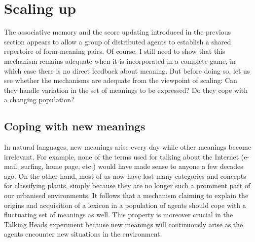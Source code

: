 \section{Scaling up} 

The associative memory and the score updating introduced
in the previous section appears to allow a group of 
distributed agents to establish a shared repertoire of
form-meaning pairs. Of course, I still need to show that 
this mechanism remains adequate when it is incorporated
in a complete game, in which case there is no direct feedback 
about meaning. But before doing so, let us see whether 
the mechanisms are adequate from the viewpoint of scaling: 
Can they handle variation in the set of meanings to 
be expressed? Do they cope with a changing population? 

\subsection{Coping with new meanings}

In natural languages, new meanings arise every day 
while other meanings become irrelevant. 
For example, none of the terms used for talking about
the Internet (e-mail,
surfing, home page, etc.) would have made sense to anyone
a few decades ago. On the other hand, most of us now have lost 
many categories and concepts for classifying plants, 
simply because they are no longer such a prominent part of our 
urbanised environments. It follows that a mechanism 
claiming to explain the origins and acquisition 
of a lexicon in a population
of agents should cope with a fluctuating set of meanings
as well. This property is moreover crucial in the Talking 
Heads experiment because new meanings will continuously 
arise as the agents encounter new situations in 
the environment. 

